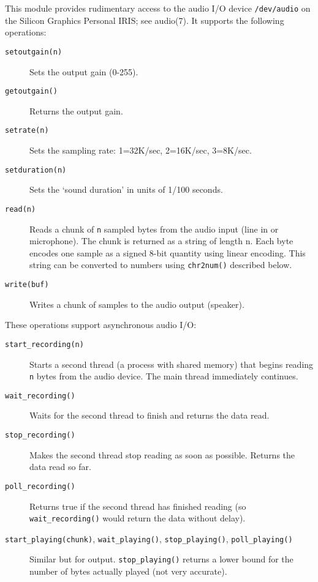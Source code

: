 This module provides rudimentary access to the audio I/O device
{\tt /dev/audio}
on the Silicon Graphics Personal IRIS; see audio(7).
It supports the following operations:
\begin{description}
\item[{\tt setoutgain(n)}]
Sets the output gain (0-255).
\item[{\tt getoutgain()}]
Returns the output gain.
\item[{\tt setrate(n)}]
Sets the sampling rate: 1=32K/sec, 2=16K/sec, 3=8K/sec.
\item[{\tt setduration(n)}]
Sets the `sound duration' in units of 1/100 seconds.
\item[{\tt read(n)}]
Reads a chunk of
{\tt n}
sampled bytes from the audio input (line in or microphone).
The chunk is returned as a string of length n.
Each byte encodes one sample as a signed 8-bit quantity using linear
encoding.
This string can be converted to numbers using {\tt chr2num()} described
below.
\item[{\tt write(buf)}]
Writes a chunk of samples to the audio output (speaker).
\end{description}

These operations support asynchronous audio I/O:
\begin{description}
\item[{\tt start\_recording(n)}]
Starts a second thread (a process with shared memory) that begins reading
{\tt n}
bytes from the audio device.
The main thread immediately continues.
\item[{\tt wait\_recording()}]
Waits for the second thread to finish and returns the data read.
\item[{\tt stop\_recording()}]
Makes the second thread stop reading as soon as possible.
Returns the data read so far.
\item[{\tt poll\_recording()}]
Returns true if the second thread has finished reading (so
{\tt wait\_recording()} would return the data without delay).
\item[{\tt start\_playing(chunk)}, {\tt wait\_playing()},
{\tt stop\_playing()}, {\tt poll\_playing()}]
\begin{sloppypar}
Similar but for output.
{\tt stop\_playing()}
returns a lower bound for the number of bytes actually played (not very
accurate).
\end{sloppypar}
\end{description}

